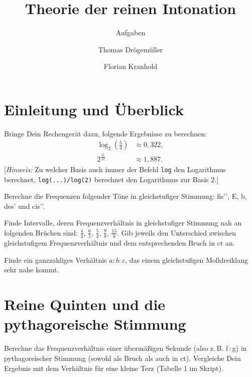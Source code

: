 \documentclass[ngerman,11pt]{scrartcl}
\title     {Theorie der reinen Intonation}
\author    {Thomas Drögemüller\and Florian Kranhold}
\subtitle  {Aufgaben}
\begin{document}
\maketitle

\section{Einleitung und Überblick}

\begin{aufg}
  Bringe Dein Rechengerät dazu, folgende Ergebnisse zu berechnen:
  \begin{align*}
    \log_2(\tfrac54) &\approx 0{,}322,\\
    2^{\frac{11}{12}} &\approx 1{,}887.
  \end{align*}
  [\emph{Hinweis:} Zu welcher Basis auch immer der Befehl \texttt{log} den Logarithmus
  berechnet, \texttt{log(...)/log(2)} berechnet den Logarithmus zur Basis $2$.]
\end{aufg}

\begin{aufg}
  Berechne die Frequenzen folgender Töne in gleichstufiger Stimmung: fis’’, E,
  b, des’ und cis’’.
\end{aufg}

\begin{aufg}
  Finde Intervalle, deren Frequenzverhältnis in gleichstufiger Stimmung nah an
  folgenden Brüchen sind: $\frac43$, $\frac65$, $\frac53$, $\frac98$,
  $\frac{15}8$. Gib jeweils den Unterschied zwischen gleichstufigem
  Frequenzverhältnis und dem entsprechenden Bruch in ct an.
\end{aufg}

\begin{aufg}
  Finde ein ganzzahliges Verhältnis $a:b:c$, das einem gleichstufigen
  Molldreiklang sehr nahe kommt.
\end{aufg}

\pagebreak
\section{Reine Quinten und die pythagoreische Stimmung}

\begin{aufg}
  Berechne das Frequenzverhältnis einer übermäßigen Sekunde (also
  z.\,B. f\,:\,\sharp g) in pythagoreischer Stimmung (sowohl als Bruch als auch
  in ct). Vergleiche Dein Ergebnis mit dem Verhältnis für eine kleine Terz
  (Tabelle 1 im Skript).
\end{aufg}
\end{document}
